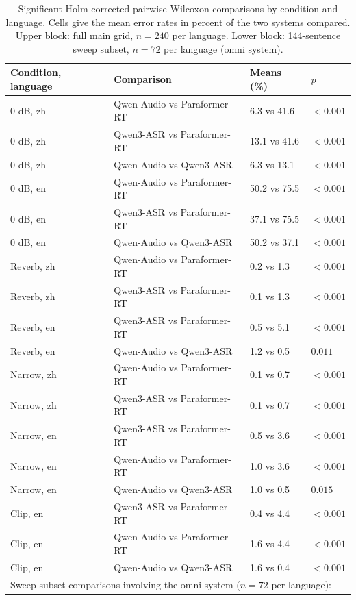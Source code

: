 \begin{table}[h]
\centering
\caption{Significant Holm-corrected pairwise Wilcoxon comparisons by
condition and language. Cells give the mean error rates in percent of the
two systems compared. Upper block: full main grid, $n{=}240$ per language.
Lower block: 144-sentence sweep subset, $n{=}72$ per language (omni
system).}\label{tab:pairwise}
\small
\setlength{\tabcolsep}{4pt}
\begin{tabular}{llll}
\toprule
Condition, language & Comparison & Means (\%) & $p$ \\
\midrule
0 dB, zh & Qwen-Audio vs Paraformer-RT & 6.3 vs 41.6 & $<0.001$ \\
0 dB, zh & Qwen3-ASR vs Paraformer-RT & 13.1 vs 41.6 & $<0.001$ \\
0 dB, zh & Qwen-Audio vs Qwen3-ASR & 6.3 vs 13.1 & $<0.001$ \\
0 dB, en & Qwen-Audio vs Paraformer-RT & 50.2 vs 75.5 & $<0.001$ \\
0 dB, en & Qwen3-ASR vs Paraformer-RT & 37.1 vs 75.5 & $<0.001$ \\
0 dB, en & Qwen-Audio vs Qwen3-ASR & 50.2 vs 37.1 & $<0.001$ \\
Reverb, zh & Qwen-Audio vs Paraformer-RT & 0.2 vs 1.3 & $<0.001$ \\
Reverb, zh & Qwen3-ASR vs Paraformer-RT & 0.1 vs 1.3 & $<0.001$ \\
Reverb, en & Qwen3-ASR vs Paraformer-RT & 0.5 vs 5.1 & $<0.001$ \\
Reverb, en & Qwen-Audio vs Qwen3-ASR & 1.2 vs 0.5 & $0.011$ \\
Narrow, zh & Qwen-Audio vs Paraformer-RT & 0.1 vs 0.7 & $<0.001$ \\
Narrow, zh & Qwen3-ASR vs Paraformer-RT & 0.1 vs 0.7 & $<0.001$ \\
Narrow, en & Qwen3-ASR vs Paraformer-RT & 0.5 vs 3.6 & $<0.001$ \\
Narrow, en & Qwen-Audio vs Paraformer-RT & 1.0 vs 3.6 & $<0.001$ \\
Narrow, en & Qwen-Audio vs Qwen3-ASR & 1.0 vs 0.5 & $0.015$ \\
Clip, en & Qwen3-ASR vs Paraformer-RT & 0.4 vs 4.4 & $<0.001$ \\
Clip, en & Qwen-Audio vs Paraformer-RT & 1.6 vs 4.4 & $<0.001$ \\
Clip, en & Qwen-Audio vs Qwen3-ASR & 1.6 vs 0.4 & $<0.001$ \\
\midrule
\multicolumn{4}{l}{\footnotesize Sweep-subset comparisons involving the omni system ($n{=}72$ per language):} \\

\end{tabular}
\end{table}
